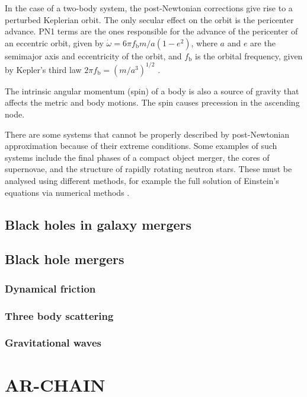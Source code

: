 \documentclass[english, oneside]{HYgradu}
\begin{document}

In the case of a two-body system, the post-Newtonian corrections give rise to a perturbed Keplerian orbit. The only secular effect on the orbit is the pericenter advance.
PN1 terms are the ones responsible for the advance of the pericenter of an eccentric orbit, given by $\dot{\omega} = 6 \pi f_\mathrm{b} m/a (1-e^2)$, where $a$ and $e$ are the semimajor axis and eccentricity of the orbit, and $f_\mathrm{b}$ is the orbital frequency, given by Kepler's third law $2 \pi f_\mathrm{b} = (m/a^3)^{1/2}$ \citep{will:2006}. 

The intrinsic angular momentum (spin) of a body is also a source of gravity that affects the metric and body motions. The spin causes precession in the ascending node. %

There are some systems that cannot be properly described by post-Newtonian approximation because of their extreme conditions. Some examples of such systems include the final phases of a compact object merger, the cores of supernovae, and the structure of rapidly rotating neutron stars. These must be analysed using different methods, for example the full solution of Einstein's equations via numerical methods \citep{will:2006}. 

\section{Black holes in galaxy mergers}

\section{Black hole mergers}
\subsection{Dynamical friction}
\subsection{Three body scattering}
\subsection{Gravitational waves}

\chapter{AR-CHAIN}
\end{document}
